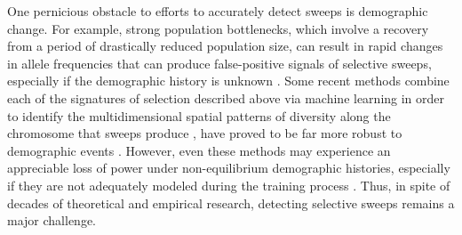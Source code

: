 One pernicious obstacle to efforts to accurately detect sweeps is demographic change. For example, strong population bottlenecks, which involve a recovery from a period of drastically reduced population size, can result in rapid changes in allele frequencies that can produce false-positive signals of selective sweeps, especially if the demographic history is unknown \cite{jensenDistinguishingSelectiveSweeps2005,mughalLocalizingClassifyingAdaptive2019,nielsenGenomicScansSelective2005}. Some recent methods combine each of the signatures of selection described above via machine learning in order to identify the multidimensional spatial patterns of diversity along the chromosome that sweeps produce \cite{caldasInferenceSelectiveSweep2022,lauterburVersatileDetectionDiverse2022,linDistinguishingPositiveSelection2011,mughalLocalizingClassifyingAdaptive2019,pybusHierarchicalBoostingMachinelearning2015,sugdenLocalizationAdaptiveVariants2018,xueDiscoveryOngoingSelective2021}, have proved to be far more robust to demographic events \cite{mughalLocalizingClassifyingAdaptive2019,schriderHICRobustIdentification2016}. However, even these methods may experience an appreciable loss of power under non-equilibrium demographic histories, especially if they are not adequately modeled during the training process \cite{mughalLocalizingClassifyingAdaptive2019,schriderHICRobustIdentification2016}. Thus, in spite of decades of theoretical and empirical research, detecting selective sweeps remains a major challenge.

